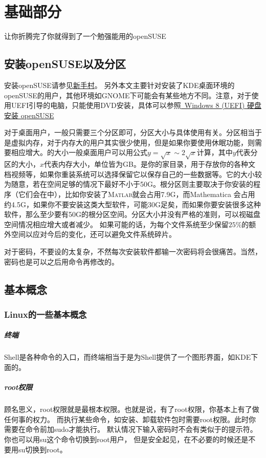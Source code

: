 \chapter{基础部分}
让你折腾完了你就得到了一个勉强能用的openSUSE
\section{安装openSUSE以及分区}
安装openSUSE请参见\href{https://zh.opensuse.org/%E6%96%B0%E6%89%8B%E6%9D%91}{新手村}。
另外本文主要针对安装了KDE桌面环境的openSUSE的用户，其他环境如GNOME下可能会有某些地方不同。注意，对于使用UEFI引导的电脑，只能使用DVD安装，具体可以参照\href{https://forum.suse.org.cn/viewtopic.php?f=2&t=802}{~Windows 8 (UEFI) 硬盘安装 openSUSE}

对于桌面用户，一般只需要三个分区即可，分区大小与具体使用有关。分区相当于是虚拟内存，对于内存大的用户其实很少使用，但是如果你要使用休眠功能，则需要相应增大。的大小一般桌面用户可以用公式$y=\sqrt{x}\sim2\sqrt{x}$计算，其中$y$代表分区的大小，$x$代表内存大小，单位皆为GB。是你的家目录，用于存放你的各种文档视频等，如果你重装系统可以选择保留它以保存自己的一些数据等。它的大小较为随意，若在空间足够的情况下最好不小于50G。根分区\command{/}则主要取决于你安装的程序（它们会在中），比如你安装了\textsc{Matlab}就会占用7.9G，而Mathematica 会占用约4.5G，如果你不要安装这类大型软件，可能30G足矣，而如果你要安装很多这种软件，那么至少要有50G的根分区空间。分区大小并没有严格的准则，可以视磁盘空间情况相应增大或者减少。
如果可能的话，为每个文件系统至少保留$25\%$的额外空间以应对今后的变化，还可以避免文件系统碎片。

对于密码，不要设的太复杂，不然每次安装软件都输一次密码将会很痛苦。当然，密码也是可以之后用命令再修改的。
\section{基本概念}
\subsection{Linux的一些基本概念}
\paragraph{终端} Shell是各种命令的入口，而终端相当于是为Shell提供了一个图形界面，如KDE下面的。

\paragraph{root权限} 顾名思义，root权限就是最根本权限。也就是说，有了root权限，你基本上有了做任何事的权力。
而执行某些命令，如安装、卸载软件包时需要root权限。此时你需要在命令前加sudo才能执行。
默认情况下输入密码时不会有类似于\command{****}的提示符。你也可以用su这个命令切换到root用户，
但是安全起见，在不必要的时候还是不要用su切换到root。

